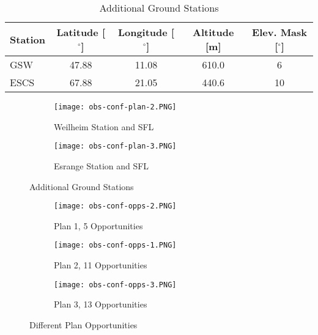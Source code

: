 \begin{table}[h] 
    \centering
    \caption{Additional Ground Stations}
    \begin{tabular}{ccccc}
	Station & Latitude [$^\circ$] & Longitude [$^\circ$] & Altitude [m] & Elev. Mask [$^\circ$] \\ \hline
	\multicolumn{1}{l|}{GSW}  & 47.88   & 11.08   & 610.0  & 6      \\
	\multicolumn{1}{l|}{ESCS} & 67.88   & 21.05   & 440.6  & 10      \\
    \end{tabular}
    \label{tab:additional-gs}
\end{table}

\begin{figure}
    \centering
    \begin{subfigure}[b]{0.95\textwidth}
	\centering
	\texttt{[image: obs-conf-plan-2.PNG]} 
	\caption{Weilheim Station and SFL}
	\label{fig:obs-conf-gs-placements-1} 
    \end{subfigure}
    \hfill
    \begin{subfigure}[b]{0.95\textwidth}
	\centering
	\texttt{[image: obs-conf-plan-3.PNG]} 
	\caption{Esrange Station and SFL}
	\label{fig:obs-conf-gs-placements-2}
    \end{subfigure}
    \caption{Additional Ground Stations}
    \label{fig:obs-conf-gs-placements} 
\end{figure}

\begin{figure}
    \centering
    \begin{subfigure}[b]{0.75\textwidth}
	\centering
	\texttt{[image: obs-conf-opps-2.PNG]} 
	\caption{Plan 1, 5 Opportunities}
	\label{fig:obs-conf-opps-1}
    \end{subfigure}
    \hfill
    \begin{subfigure}[b]{0.75\textwidth}
	\centering
	\texttt{[image: obs-conf-opps-1.PNG]} 
	\caption{Plan 2, 11 Opportunities}
	\label{fig:obs-conf-opps-2} 
    \end{subfigure}
    \hfill
    \begin{subfigure}[b]{0.75\textwidth}
	\centering
	\texttt{[image: obs-conf-opps-3.PNG]} 
	\caption{Plan 3, 13 Opportunities}
	\label{fig:obs-conf-opps-3} 
    \end{subfigure}

    \caption{Different Plan Opportunities}
    \label{fig:obs-conf-opps}
\end{figure}

